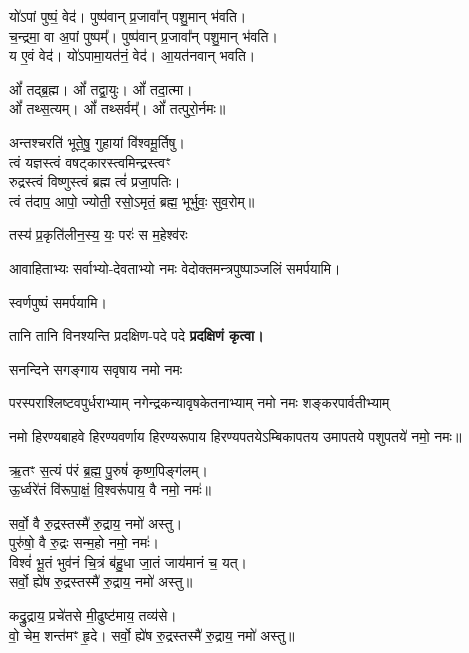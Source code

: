 \begin{center}
यो॑ऽपां पुष्पं॒ वेद॑। पुष्प॑वान् प्र॒जावा᳚न् पशु॒मान् भ॑वति।\\
च॒न्द्रमा॒ वा अ॒पां पुष्पम्᳚। पुष्प॑वान् प्र॒जावा᳚न् पशु॒मान् भ॑वति।\\
य ए॒वं वेद॑। यो॑ऽपामा॒यत॑नं॒ वेद॑। आ॒यत॑नवान् भवति।\medskip

ओं᳚ तद्ब्र॒ह्म। ओं᳚ तद्वा॒युः। ओं᳚ तदा॒त्मा।\\ ओं᳚ तथ्स॒त्यम्‌।
ओं᳚ तथ्सर्वम्᳚‌। ओं᳚ तत्पुरो॒र्नमः॥\medskip

अन्तश्चरति॑ भूते॒षु॒ गुहायां वि॑श्वमू॒र्तिषु। \\
त्वं यज्ञस्त्वं वषट्कारस्त्वमिन्द्रस्त्वꣳ\\ रुद्रस्त्वं विष्णुस्त्वं ब्रह्म त्वं॑ प्रजा॒पतिः। \\
त्वं त॑दाप॒ आपो॒ ज्योती॒ रसो॒ऽमृतं॒ ब्रह्म॒ भूर्भुवः॒ सुव॒रोम्‌॥\medskip

{तस्य॑ प्र॒कृति॑लीन॒स्य॒ यः॒ परः॑ स म॒हेश्व॑रः}
\medskip

आवाहिताभ्यः सर्वाभ्यो-देवताभ्यो नमः वेदोक्तमन्त्रपुष्पाञ्जलिं समर्पयामि।\medskip

स्वर्णपुष्पं समर्पयामि।\medskip


{तानि तानि विनश्यन्ति प्रदक्षिण-पदे पदे}
\textbf{प्रदक्षिणं कृत्वा।}
\medskip


{सनन्दिने सगङ्गाय सवृषाय नमो नमः}

{परस्पराश्लिष्टवपुर्धराभ्याम्‌}
{नगेन्द्रकन्यावृषकेतनाभ्याम्‌}
{नमो नमः शङ्करपार्वतीभ्याम्‌}%

नमो हिरण्यबाहवे हिरण्यवर्णाय हिरण्यरूपाय हिरण्यपतये\-ऽम्बिकापतय उमापतये पशुपतये॑ नमो॒ नमः॥%

ऋ॒तꣳ स॒त्यं प॑रं ब्र॒ह्म॒ पु॒रुषं॑ कृष्ण॒पिङ्ग॑लम्।\\ 
ऊ॒र्ध्वरे॑तं वि॑रूपा॒क्षं॒ वि॒श्वरू॑पाय॒ वै नमो॒ नमः॑॥%

सर्वो॒ वै रु॒द्रस्तस्मै॑ रु॒द्राय॒ नमो॑ अस्तु।\\ 
पुरु॑षो॒ वै रु॒द्रः सन्म॒हो नमो॒ नमः॑।\\
विश्वं॑ भू॒तं भुव॑नं चि॒त्रं ब॑हु॒धा जा॒तं जाय॑मानं च॒ यत्।\\
सर्वो॒ ह्ये॑ष रु॒द्रस्तस्मै॑ रु॒द्राय॒ नमो॑ अस्तु॥%


कद्रु॒द्राय॒ प्रचे॑तसे मी॒ढुष्ट॑माय॒ तव्य॑से।\\ 
वो॒ चेम॒ शन्त॑मꣳ हृ॒दे। 
सर्वो॒ ह्ये॑ष रु॒द्रस्तस्मै॑ रु॒द्राय॒ नमो॑ अस्तु॥%



\end{center}
